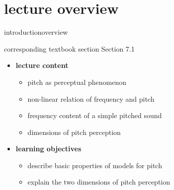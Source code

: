 


\subtitle{Module 7.1: Human Perception of Pitch}


	

    \section[overview]{lecture overview}
        \begin{frame}{introduction}{overview}
            \begin{block}{corresponding textbook section}
                    Section 7.1
            \end{block}

            \begin{itemize}
                \item   \textbf{lecture content}
                    \begin{itemize}
                        \item   pitch as perceptual phenomenon 
                        \item   non-linear relation of frequency and pitch
                        \item   frequency content of a simple pitched sound
                        \item   dimensions of pitch perception
                    \end{itemize}
                \bigskip
                \item<2->   \textbf{learning objectives}
                    \begin{itemize}
                        \item   describe basic properties of models for pitch
                        \item   explain the two dimensions of pitch perception
                    \end{itemize}
            \end{itemize}
        \end{frame}

